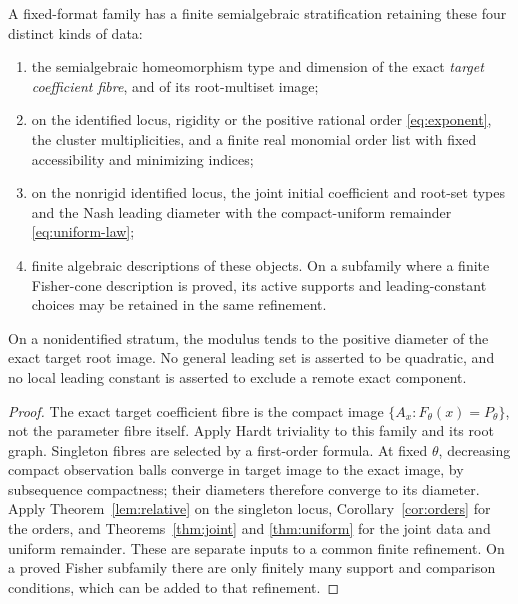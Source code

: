 \begin{theorem}\label{thm:atlas}
A fixed-format family has a finite semialgebraic stratification retaining
these four distinct kinds of data:
\begin{enumerate}
\item the semialgebraic homeomorphism type and dimension of the exact
\emph{target coefficient fibre}, and of its root-multiset image;
\item on the identified locus, rigidity or the positive rational order
\eqref{eq:exponent}, the cluster multiplicities, and a finite real
monomial order list with fixed accessibility and minimizing indices;
\item on the nonrigid identified locus, the joint initial coefficient
and root-set types and the Nash leading diameter with the
compact-uniform remainder \eqref{eq:uniform-law};
\item finite algebraic descriptions of these objects. On a subfamily
where a finite Fisher-cone description is proved, its active supports
and leading-constant choices may be retained in the same refinement.
\end{enumerate}
On a nonidentified stratum, the modulus tends to the positive diameter
of the exact target root image. No general leading set is asserted to
be quadratic, and no local leading constant is asserted to exclude a
remote exact component.
\end{theorem}
\begin{proof}
The exact target coefficient fibre is the compact image
$\{A_x:F_\theta(x)=P_\theta\}$, not the parameter fibre itself.
Apply Hardt triviality to this family and its root graph. Singleton
fibres are selected by a first-order formula. At fixed $\theta$,
decreasing compact observation balls converge in target image to the
exact image, by subsequence compactness; their diameters therefore
converge to its diameter. Apply Theorem~\ref{lem:relative} on the
singleton locus, Corollary~\ref{cor:orders} for the orders, and
Theorems~\ref{thm:joint} and \ref{thm:uniform} for the joint data and
uniform remainder. These are separate inputs to a common finite
refinement. On a proved Fisher subfamily there are only finitely many
support and comparison conditions, which can be added to that refinement.
\end{proof}

